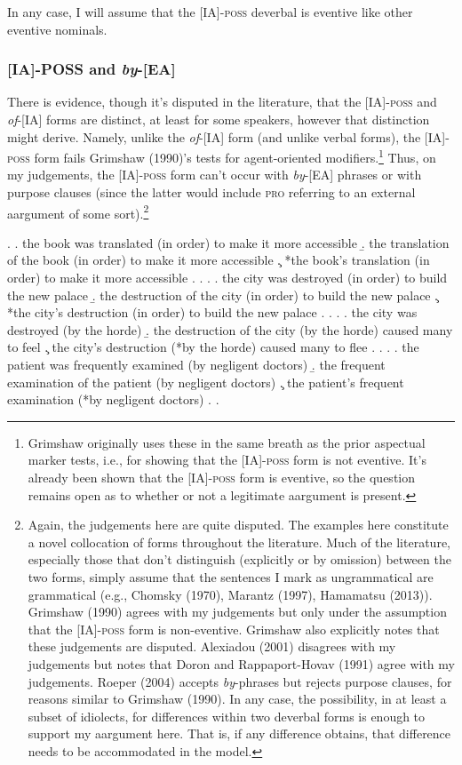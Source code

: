 \documentclass[12pt]{article}
\begin{document}
\doublespacing

In any case, I will assume that the [IA]-\textsc{poss} deverbal is eventive like other eventive nominals.


\subsubsection{[IA]-POSS and \textit{by}-[EA]}\label{facts3.2}

There is evidence, though it's disputed in the literature, that the [IA]-\textsc{poss} and \textit{of}-[IA] forms are distinct, at least for some speakers, however that distinction might derive. Namely, unlike the \textit{of}-[IA] form (and unlike verbal forms), the [IA]-\textsc{poss} form fails Grimshaw (1990)'s tests for agent-oriented modifiers.\footnote{ Grimshaw originally uses these in the same breath as the prior aspectual marker tests, i.e., for showing that the [IA]-\textsc{poss} form is not eventive. It's already been shown that the [IA]-\textsc{poss} form is eventive, so the question remains open as to whether or not a legitimate aargument is present.} Thus, on my judgements, the [IA]-\textsc{poss} form can't occur with \textit{by}-[EA] phrases or with purpose clauses (since the latter would include \textsc{pro} referring to an external aargument of some sort).\footnote{ Again, the judgements here are quite disputed. The examples here constitute a novel collocation of forms throughout the literature. Much of the literature, especially those that don't distinguish (explicitly or by omission) between the two forms, simply assume that the sentences I mark as ungrammatical are grammatical (e.g., Chomsky (1970), Marantz (1997), Hamamatsu (2013)). Grimshaw (1990) agrees with my judgements but only under the assumption that the [IA]-\textsc{poss} form is non-eventive. Grimshaw also explicitly notes that these judgements are disputed. Alexiadou (2001) disagrees with my judgements but notes that Doron and Rappaport-Hovav (1991) agree with my judgements. Roeper (2004) accepts \textit{by}-phrases but rejects purpose clauses, for reasons similar to Grimshaw (1990). In any case, the possibility, in at least a subset of idiolects, for differences within two deverbal forms is enough to support my aargument here. That is, if any difference obtains, that difference needs to be accommodated in the model.}

\singlespacing
\ex.
\a. the book was translated (in order) to make it more accessible
\b. the translation of the book (in order) to make it more accessible
\c. *the book's translation (in order) to make it more accessible
\z. \z. 
\ex.
\a. the city was destroyed (in order) to build the new palace
\b. the destruction of the city (in order) to build the new palace
\c. *the city's destruction (in order) to build the new palace
\z. \z. 
\ex. 
\a. the city was destroyed (by the horde)
\b. the destruction of the city (by the horde) caused many to feel
\c. the city's destruction (*by the horde) caused many to flee
\z. \z. 
\ex. 
\a. the patient was frequently examined (by negligent doctors)
\b. the frequent examination of the patient (by negligent doctors)
\c. the patient's frequent examination (*by negligent doctors)\footnotemark
\z. \z. \par
\end{document}
